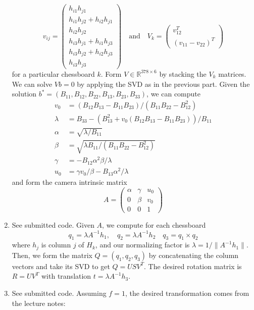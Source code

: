 \documentclass[12pt]{article}
\begin{document}
\begin{enumerate}
		\[
			v_{ij} = \left(\begin{array}{c}
					h_{i1}h_{j1} \\
					h_{i1}h_{j2} + h_{i2}h_{j1} \\
					h_{i2}h_{j2} \\
					h_{i3}h_{j1} + h_{i1}h_{j3} \\
					h_{i3}h_{j2} + h_{i2}h_{j3} \\
					h_{i3}h_{j3}
				\end{array}\right) \quad \mbox{and} \quad
			V_k = \left(\begin{array}{c}
					v_{12}^T \\
					(v_{11} - v_{22})^T
				\end{array}\right)
		\]
		for a particular chessboard $k$. Form $V \in \mathbb{R}^{378 \times 6}$ by stacking the $V_k$ matrices. We can solve $Vb = 0$ by applying the SVD as in the previous part. Given the solution $b^* = (B_{11}, B_{12}, B_{22}, B_{13}, B_{23}, B_{33})$, we can compute
		\begin{align*}
			v_0 &= (B_{12}B_{13} - B_{11}B_{23})/(B_{11}B_{22} - B_{12}^2) \\
			\lambda &= B_{33} - (B_{13}^2 + v_0(B_{12}B_{13} - B_{11}B_{23}))/B_{11} \\
			\alpha &= \sqrt{\lambda/B_{11}} \\
			\beta &= \sqrt{\lambda B_{11}/(B_{11}B_{22} - B_{12}^2)} \\
			\gamma &= -B_{12}\alpha^2\beta/\lambda \\
			u_0 &= \gamma v_0/\beta - B_{13}\alpha^2/\lambda
		\end{align*}
		and form the camera intrinsic matrix
		\[
			A = \left(\begin{array}{ccc}
				\alpha & \gamma & u_0 \\
				0 & \beta & v_0 \\
				0 & 0 & 1
			\end{array}\right)
		\]
	\item See submitted code. Given $A$, we compute for each chessboard
		\[
			q_1 = \lambda A^{-1}h_1, \quad q_2 = \lambda A^{-1}h_2 \quad q_3 = q_1 \times q_2
		\]
		where $h_j$ is column $j$ of $H_k$, and our normalizing factor is $\lambda = 1/\|A^{-1}h_1\|$. Then, we form the matrix $Q = (q_1, q_2, q_3)$ by concatenating the column vectors and take its SVD to get $Q = USV^T$. The desired rotation matrix is $R = UV^T$ with translation $t = \lambda A^{-1}h_3$.
	\item See submitted code. Assuming $f = 1$, the desired transformation comes from the lecture notes:

\end{enumerate}
\end{document}
